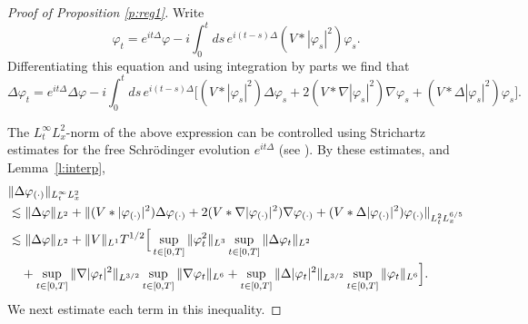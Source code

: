 \documentclass[11pt,a4paper]{scrartcl} %
\begin{document}
\begin{proof}[Proof of Proposition \ref{p:reg1}]
  Write
  \begin{displaymath}
    \varphi_t = e^{it\Delta} \varphi - i \int_0^t ds \, e^{i(t-s)\Delta} (V *
    |\varphi_s|^2) \varphi_s.
  \end{displaymath}
  Differentiating this equation and using integration by parts we find that
  \begin{displaymath}
    \Delta \varphi_t = e^{it \Delta} \Delta \varphi - i \int_0^t ds \,
    e^{i(t-s) \Delta} \big[ (V * |\varphi_s|^2) \Delta \varphi_s + 2(V *
    \nabla |\varphi_s|^2) \nabla \varphi_s + (V * \Delta |\varphi_s|^2)
    \varphi_s \big].
  \end{displaymath}


  The $L_t^\infty L_x^2$-norm of the above expression can be controlled using
  Strichartz estimates for the free Schr\"odinger evolution $e^{it\Delta}$
  (see \cite[Theorem 1.2]{KT}). By these estimates, and Lemma~\ref{l:interp},
  \begin{align}
    & \| \Delta \varphi_{(\cdot)} \|_{L_t^\infty L_x^2} \notag \\
    & \apprle \| \Delta \varphi \|_{L^2} + \| (V * |\varphi_{(\cdot)}|^2)
    \Delta \varphi_{(\cdot)} + 2(V * \nabla |\varphi_{(\cdot)}|^2) \nabla
    \varphi_{(\cdot)} + (V * \Delta |\varphi_{(\cdot)}|^2) \varphi_{(\cdot)}
    \|_{L_t^2 L_x^{6/5}} \notag \\
    & \apprle \| \Delta \varphi \|_{L^2} + \| V \|_{L^1} T^{1/2} \Big[ \sup_{t
    \in [0,T]} \| \varphi_t^2 \|_{L^3} \sup_{t \in [0,T]} \| \Delta \varphi_t
    \|_{L^2} \notag \\
    & \quad + \sup_{t \in [0,T]} \| \nabla |\varphi_t|^2 \|_{L^{3/2}} \sup_{t
    \in [0,T]} \| \nabla \varphi_t \|_{L^6} + \sup_{t \in [0,T]} \| \Delta
    |\varphi_t|^2 \|_{L^{3/2}} \sup_{t \in [0,T]} \| \varphi_t \|_{L^6} \Big].
    \label{Lap}
  \end{align}
  We next estimate each term in this inequality.
  

\end{proof}
\end{document}
